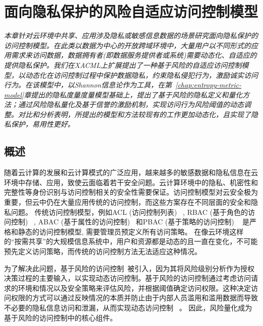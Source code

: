 \chapter{面向隐私保护的风险自适应访问控制模型}
\label{chap:RaBAC-for-privacy}

\textit{ }

\textit{本章针对云环境中共享、应用涉及隐私或敏感信息数据的场景研究面向隐私保护的访问控制模型。在此类以数据为中心的开放跨域环境中，大量用户以不同形式的应用需求来访问数据，数据拥有者(即数据服务提供者或系统)需要动态化、自适应的提供隐私保护。我们在XACML上扩展提出了一种基于风险的自适应访问控制模型，以动态化在访问控制过程中保护数据隐私，约束隐私侵犯行为，激励诚实访问行为。在该模型中，以Shannon信息论作为工具，在第~\ref{chap:entropy-metric-model}章提出的隐私度量度量模型基础上，提出了基于风险的隐私定义和量化方法；通过风险隐私量化及基于信誉的激励机制，实现访问行为风险阈值的动态调整。对比和分析表明，所提出的模型和方法较现有的工作更加动态化，且实现了隐私保护，易用性更好。
}
\section{概述}
\label{sec:intro}
随着云计算的发展和云计算模式的广泛应用，越来越多的敏感数据和隐私信息在云环境中存储、应用，致使云面临着若干安全问题。云计算环境中的隐私、机密性和完整性等身份识别与访问控制相关的安全性需要保证。访问控制模型对云安全极为重要，但云中仍在大量应用传统的访问控制，而这些方案存在不同层面的安全和隐私问题。
传统访问控制模型，例如ACL (访问控制列表) ~\cite{qian2001acla}, RBAC (基于角色的访问控制) ~\cite{jung2012cribac}, ABAC (基于属性的访问控制) ~\cite{zhang2011attribute}和PBAC (基于策略的访问控制) ~\cite{huang2011policy} 是严格和静态的访问控制模型, 需要管理员预定义所有访问策略。 在像云环境这样的“按需共享”的大规模信息系统中，用户和资源都是动态的且一直在变化，不可能预先定义访问策略，而传统的访问控制方法无法适应这种情况。

为了解决此问题，基于风险的访问控制~\cite{ni2010risk,shaikh2012dynamic,wang2011quantified,choi2015framework}被引入，因为其将风险级别分析作为授权决策过程的主要输入，以实现动态访问控制。基于风险的访问控制通过考虑访问请求的环境和情况以及安全策略来评估风险，并根据阈值确定访问权限。这种决定访问权限的方式可以通过反映情况的本质并防止由于内部人员滥用和滥用数据而导致不必要的隐私信息访问和泄漏，从而实现动态访问控制 ~\cite{chen2011risk}。 因此，风险量化成为基于风险的访问控制中的核心组件。


